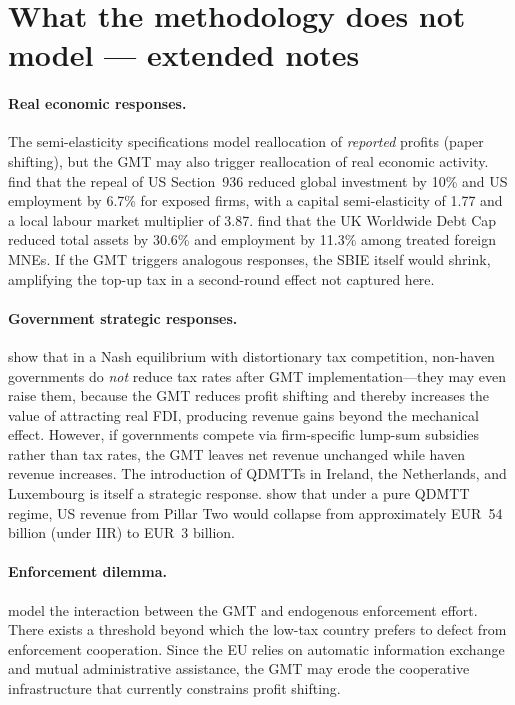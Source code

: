 \documentclass[11pt,a4paper]{article}
\begin{document}
\section{What the methodology does not model --- extended notes}\label{w:limitations}

\paragraph{Real economic responses.} The semi-elasticity specifications model reallocation of \emph{reported} profits (paper shifting), but the GMT may also trigger reallocation of real economic activity. \citet{suarezserrato2018} find that the repeal of US Section~936 reduced global investment by 10\% and US employment by 6.7\% for exposed firms, with a capital semi-elasticity of 1.77 and a local labour market multiplier of 3.87. \citet{bilicka2022} find that the UK Worldwide Debt Cap reduced total assets by 30.6\% and employment by 11.3\% among treated foreign MNEs. If the GMT triggers analogous responses, the SBIE itself would shrink, amplifying the top-up tax in a second-round effect not captured here.

\paragraph{Government strategic responses.} \citet{janeba2023} show that in a Nash equilibrium with distortionary tax competition, non-haven governments do \emph{not} reduce tax rates after GMT implementation---they may even raise them, because the GMT reduces profit shifting and thereby increases the value of attracting real FDI, producing revenue gains beyond the mechanical effect. However, if governments compete via firm-specific lump-sum subsidies rather than tax rates, the GMT leaves net revenue unchanged while haven revenue increases. The introduction of QDMTTs in Ireland, the Netherlands, and Luxembourg is itself a strategic response. \citet{barake2022} show that under a pure QDMTT regime, US revenue from Pillar Two would collapse from approximately EUR~54 billion (under IIR) to EUR~3 billion.

\paragraph{Enforcement dilemma.} \citet{jean2026} model the interaction between the GMT and endogenous enforcement effort. There exists a threshold beyond which the low-tax country prefers to defect from enforcement cooperation. Since the EU relies on automatic information exchange and mutual administrative assistance, the GMT may erode the cooperative infrastructure that currently constrains profit shifting.
\end{document}
